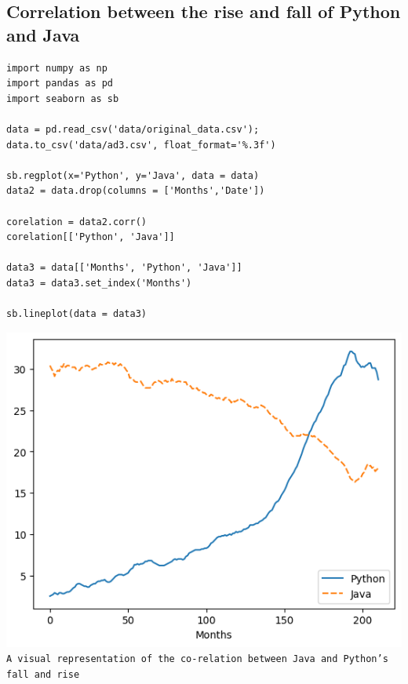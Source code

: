 \documentclass[conference]{IEEEtran}
\begin{document}
\subsection{Correlation between the rise and fall of Python and Java}

\begin{lstlisting}
import numpy as np
import pandas as pd
import seaborn as sb

data = pd.read_csv('data/original_data.csv');
data.to_csv('data/ad3.csv', float_format='%.3f')

sb.regplot(x='Python', y='Java', data = data)
data2 = data.drop(columns = ['Months','Date'])

corelation = data2.corr()
corelation[['Python', 'Java']]

data3 = data[['Months', 'Python', 'Java']]
data3 = data3.set_index('Months')

sb.lineplot(data = data3)
\end{lstlisting}

\includegraphics[scale=0.5]{lineplot/java-v-python.png}\\
\texttt{A visual representation of the co-relation between Java and Python's fall and rise}\\
\end{document}
